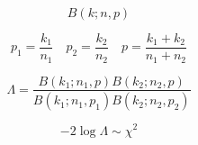 \documentclass[11pt]{article}
\begin{document}
$$
B(k; n, p)
$$

$$
p_1 = \frac{k_1}{n_1}
\quad
p_2 = \frac{k_2}{n_2}
\quad
p = \frac{k_1 + k_2}{n_1 + n_2}
$$

$$
\Lambda = \frac{B(k_1; n_1, p) B(k_2; n_2, p)}{B(k_1; n_1, p_1) B(k_2; n_2, p_2)}
$$


$$
-2 \log{\Lambda} \sim \chi^{2}
$$
\end{document}
